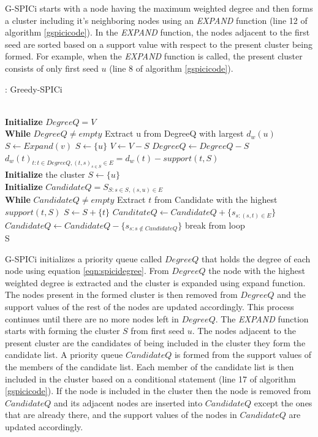 \documentclass[times]{dacauth}
\begin{document}
\smallskip
G-SPICi starts with a node having the maximum weighted degree and then forms a cluster including it's neighboring nodes using an \emph{EXPAND} function (line 12 of algorithm \ref{gspicicode}).
In the \emph{EXPAND} function, the nodes adjacent to the first seed are sorted based on a support value with respect to the present cluster being formed. For example, when the \emph{EXPAND} function is called, the present cluster consists of only first seed $u$ (line 8 of algorithm \ref{gspicicode}).
\begin{algorithm}
	\caption{: Greedy-SPICi}\label{gspicicode}
	\begin{algorithmic}[1]
		 \\
		\textbf{Initialize} $DegreeQ = V$ \\
		\textbf{While} $DegreeQ \neq empty$
		\State Extract u from DegreeQ with largest $d_w(u)$
		\State $S \gets Expand(v)$
		\Else 
		\State $S \gets \{u\}$
		\EndIf
		\State $V \gets V - S $
		\State $Degree Q \gets Degree Q - S$
		\State $d_w(t)_{t:t\in DegreeQ,(t,s)_{s\in S}\in E} = d_w(t) - support(t,S)$
		\EndProcedure
		\\
		\textbf{Initialize} the cluster $S \gets \{u\}$ \\
		\textbf{Initialize} $CandidateQ = S_{S:s\in S,(s,u)\in E}$\\
		\textbf{While} $CandidateQ \neq empty$
		\State Extract $t$ from Candidate with the highest $support(t,S)$
		\State $S\gets S+\{t\}$
		\State $CanditateQ \gets CandidateQ + \{s_{s:(s,t)\in E}\}$
		\State $CandidateQ \gets CandidateQ - \{s_{s:s\not\in CandidateQ}\}$
		\Else
		\State break from loop
		\EndIf \\
		\Return S
		\EndProcedure
	\end{algorithmic}
\end{algorithm}
G-SPICi initializes a priority queue called $DegreeQ$ that holds the degree of each node using equation \ref{eqn:spicidegree}. From $DegreeQ$ the node with the highest weighted degree is extracted and the cluster is expanded using expand function. The nodes present in the formed cluster is then removed from $DegreeQ$ and the support values of the rest of the nodes are updated accordingly. This process continues until there are no more nodes left in $DegreeQ$.
The \emph{EXPAND} function starts with forming the cluster $S$ from first seed $u$. The nodes adjacent to the present cluster are the candidates of being included in the cluster they form the candidate list. A priority queue $CandidateQ$ is formed from the support values of the members of the candidate list. Each member of the candidate list is then included in the cluster based on a conditional statement (line 17 of algorithm \ref{gspicicode}). If the node is included in the cluster then the node is removed from $CandidateQ$ and its adjacent nodes are inserted into $CandidateQ$ except the ones that are already there, and the support values of the nodes in $CandidateQ$ are updated accordingly.
\end{document}
